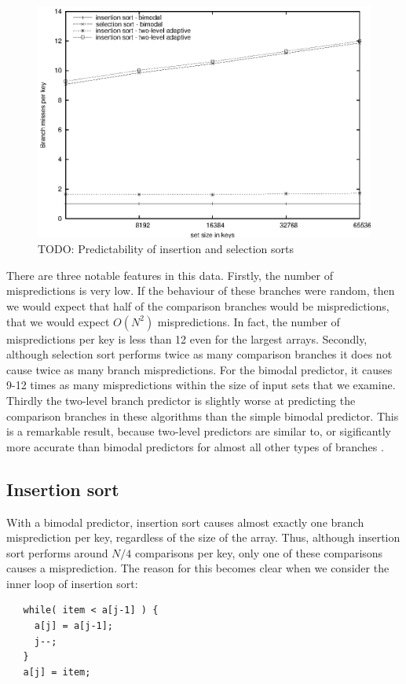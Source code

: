 \documentclass[acmtocl]{acmtrans2m}
\newcommand{\mainscale}{1}
\begin{document}
\begin{figure}[h]
\includegraphics[scale=\mainscale]{plots/bpred_misses_insert_select.eps}
\caption{TODO: Predictability of insertion and selection sorts}
\label{Predictability-of-insertion-and-selection-sorts}
\end{figure}

There are three notable features in this data. Firstly, the number of
mispredictions is very low. If the behaviour of these branches were
random, then we would expect that half of the comparison branches
would be mispredictions, that we would expect $O(N^2)$
mispredictions. In fact, the number of mispredictions per key is less
than 12 even for the largest arrays. Secondly, although selection sort
performs twice as many comparison branches it does not cause twice as
many branch mispredictions. For the bimodal predictor, it causes 9-12
times as many mispredictions within the size of input sets that we
examine. Thirdly the two-level branch predictor is slightly worse at
predicting the comparison branches in these algorithms than the simple
bimodal predictor.  This is a remarkable result, because two-level
predictors are similar to, or sigificantly more accurate than bimodal
predictors for almost all other types of branches \cite{Uht}.

\subsection{Insertion sort}
With a bimodal predictor, insertion sort causes almost exactly one
branch misprediction per key, regardless of the size of the array.
Thus, although insertion sort performs around $N/4$ comparisons per
key, only one of these comparisons causes a misprediction. The
reason for this becomes clear when we consider the inner loop
of insertion sort:
\begin{verbatim}
   while( item < a[j-1] ) {
     a[j] = a[j-1];
     j--;
   }
   a[j] = item;
\end{verbatim}
\end{document}
